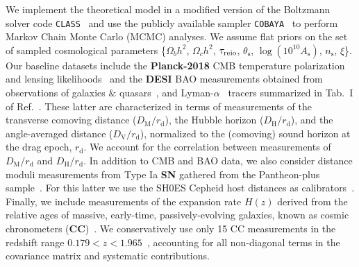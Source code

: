 \documentclass[superscriptaddress,twocolumn,showpacs,a4paper,
amssymb,amsmath,nobibnotes,aps,prl,
showkeys,
nofootinbib,notitlepage]{revtex4-1}
\begin{document}
\bigskip
We implement the theoretical model in a modified version of the Boltzmann solver code \texttt{CLASS}~\cite{Blas:2011rf} and use the publicly available sampler \texttt{COBAYA}~\cite{Torrado:2020dgo} to perform Markov Chain Monte Carlo (MCMC) analyses. We assume flat priors on the set of sampled cosmological parameters \{$\Omega_b h^2$, $\Omega_c h^2$, $\tau_{\rm reio}$, $\theta_{\mathrm{s}}$, $\log(10^{10} A_{\mathrm{s}})$, $n_{\mathrm{s}}$, $\xi$\}. Our baseline datasets include the \textbf{Planck-2018} CMB temperature polarization and lensing likelihoods~\cite{Planck:2019nip,Planck:2018vyg,Planck:2018nkj} and the \textbf{DESI} BAO measurements obtained from observations of galaxies $\&$ quasars~\cite{DESI:2024uvr}, and Lyman-$\alpha$~\cite{DESI:2024lzq} tracers summarized in Tab.~I of Ref.~\cite{desicollaboration2024desi}. These latter are characterized in terms of measurements of the transverse comoving distance ($D_{\mathrm{M}}/r_{\mathrm{d}}$), the Hubble horizon ($D_{\mathrm{H}}/r_{\mathrm{d}}$), and the angle-averaged distance ($D_{\mathrm{V}}/r_{\mathrm{d}}$), normalized to the (comoving) sound horizon at the drag epoch, $r_{\mathrm{d}}$. We account for the correlation between measurements of $D_{\mathrm{M}}/r_{\mathrm{d}}$ and $D_{\mathrm{H}}/r_{\mathrm{d}}$. In addition to CMB and BAO data, we also consider distance moduli measurements from Type Ia \textbf{SN} gathered from the Pantheon-plus sample~\cite{Brout:2022vxf}. For this latter we use the SH0ES Cepheid host distances as calibrators~\cite{Riess:2021jrx}. Finally, we include measurements of the expansion rate $H(z)$ derived from the relative ages of massive, early-time, passively-evolving galaxies, known as cosmic chronometers (\textbf{CC})~\cite{Jimenez:2001gg}. We conservatively use only 15 CC measurements in the redshift range $0.179<z<1.965$~\cite{Moresco:2012by,Moresco:2015cya,Moresco:2016mzx}, accounting for all non-diagonal terms in the covariance matrix and systematic contributions.

\end{document}
